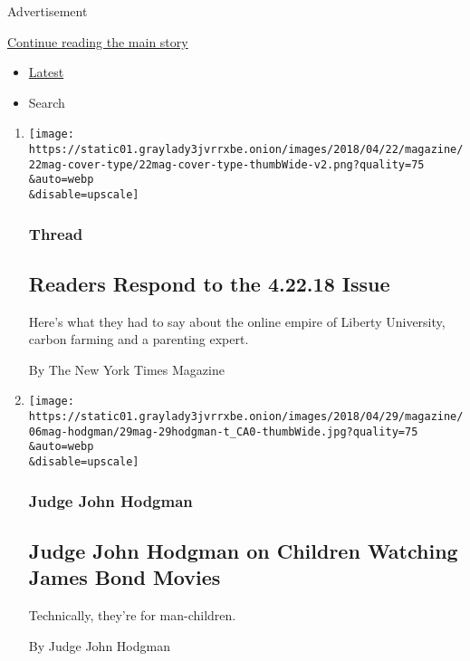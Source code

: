 Advertisement

\protect\hyperlink{after-mid1}{Continue reading the main story}

\begin{itemize}
\tightlist
\item
  \protect\hyperlink{stream-panel}{Latest}
\item
  Search
\end{itemize}

\begin{enumerate}
\def\labelenumi{\arabic{enumi}.}
\item
  \href{/2018/05/04/magazine/readers-respond-to-the-4-22-18-issue.html}{}

  \texttt{[image: https://static01.graylady3jvrrxbe.onion/images/2018/04/22/magazine/22mag-cover-type/22mag-cover-type-thumbWide-v2.png?quality=75\\\&auto=webp\\\&disable=upscale]}

  \hypertarget{thread}{%
  \subsubsection{Thread}\label{thread}}

  \hypertarget{readers-respond-to-the-42218-issue}{%
  \subsection{Readers Respond to the 4.22.18
  Issue}\label{readers-respond-to-the-42218-issue}}

  Here's what they had to say about the online empire of Liberty
  University, carbon farming and a parenting expert.

  By The New York Times Magazine
\item
  \href{/2018/05/03/magazine/judge-john-hodgman-on-children-watching-james-bond-movies.html}{}

  \texttt{[image: https://static01.graylady3jvrrxbe.onion/images/2018/04/29/magazine/06mag-hodgman/29mag-29hodgman-t\_CA0-thumbWide.jpg?quality=75\\\&auto=webp\\\&disable=upscale]}

  \hypertarget{judge-john-hodgman}{%
  \subsubsection{Judge John Hodgman}\label{judge-john-hodgman}}

  \hypertarget{judge-john-hodgman-on-children-watching-james-bond-movies}{%
  \subsection{Judge John Hodgman on Children Watching James Bond
  Movies}\label{judge-john-hodgman-on-children-watching-james-bond-movies}}

  Technically, they're for man-children.

  By Judge John Hodgman
\end{enumerate}

